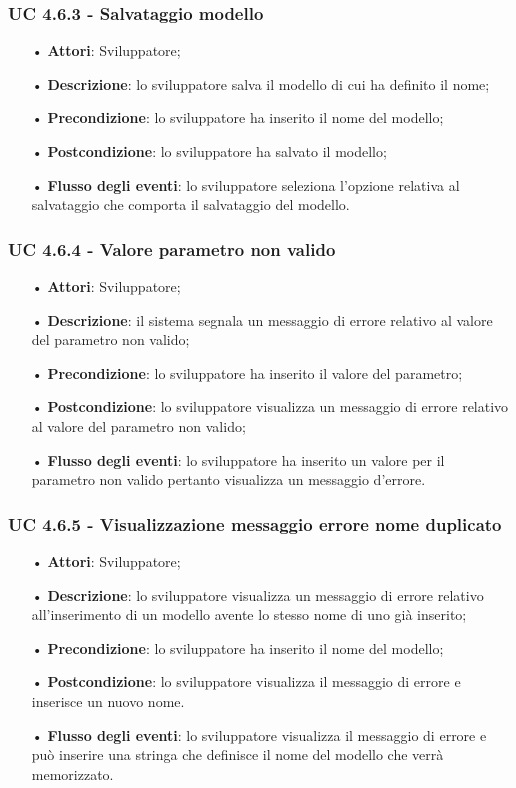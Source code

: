 \subsubsection{UC 4.6.3 - Salvataggio modello}
\begin{itemize}
	\item[•]\textbf{Attori}: Sviluppatore;
	\item[•]\textbf{Descrizione}: lo sviluppatore salva il modello di cui ha definito il nome;
	\item[•]\textbf{Precondizione}: lo sviluppatore ha inserito il nome del modello;
	\item[•]\textbf{Postcondizione}: lo sviluppatore ha salvato il modello;
	\item[•]\textbf{Flusso degli eventi}: lo sviluppatore seleziona l'opzione relativa al salvataggio che comporta il salvataggio del modello.
\end{itemize}

\subsubsection{UC 4.6.4 - Valore parametro non valido}
\begin{itemize}
	\item[•]\textbf{Attori}: Sviluppatore;
	\item[•]\textbf{Descrizione}: il sistema segnala un messaggio di errore relativo al valore del parametro non valido;
	\item[•]\textbf{Precondizione}: lo sviluppatore ha inserito il valore del parametro;
	\item[•]\textbf{Postcondizione}: lo sviluppatore visualizza un messaggio di errore relativo al valore del parametro non valido;
	\item[•]\textbf{Flusso degli eventi}:  lo sviluppatore ha inserito un valore per il parametro non valido pertanto visualizza un messaggio d'errore.
\end{itemize}
\subsubsection{UC 4.6.5 - Visualizzazione messaggio errore nome duplicato}
\begin{itemize}
	\item[•]\textbf{Attori}: Sviluppatore;
	\item[•]\textbf{Descrizione}: lo sviluppatore visualizza un messaggio di errore relativo all'inserimento di un modello avente lo stesso nome di uno già inserito;
	\item[•]\textbf{Precondizione}: lo sviluppatore ha inserito il nome del modello;
	\item[•]\textbf{Postcondizione}: lo sviluppatore visualizza il messaggio di errore e inserisce un nuovo nome.
	\item[•]\textbf{Flusso degli eventi}:  lo sviluppatore visualizza il messaggio di errore e può inserire una stringa che definisce il nome del modello che verrà memorizzato.
\end{itemize}

